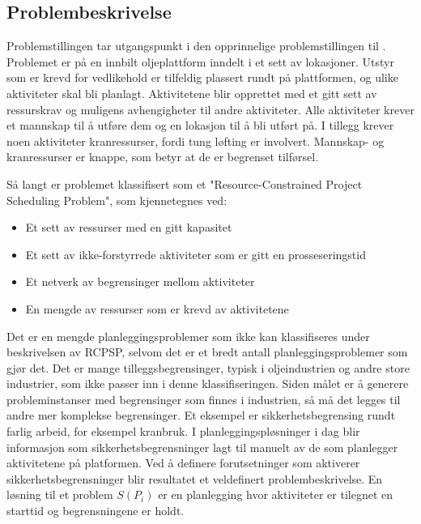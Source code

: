 \subsection{Problembeskrivelse}
Problemstillingen tar utgangspunkt i den opprinnelige problemstillingen til \bht. Problemet er på en innbilt oljeplattform inndelt i et sett av lokasjoner. Utstyr som er krevd for vedlikehold er tilfeldig plassert rundt på plattformen, og ulike aktiviteter skal bli planlagt. Aktivitetene blir opprettet med et gitt sett av ressurskrav og muligens avhengigheter til andre aktiviteter. Alle aktiviteter krever et mannskap til å utføre dem og en lokasjon til å bli utført på. I tillegg krever noen aktiviteter kranressurser, fordi tung løfting er involvert. Mannskap- og kranressurser er knappe, som betyr at de er begrenset tilførsel.

Så langt er problemet klassifisert som et "Resource-Constrained Project Scheduling Problem", som kjennetegnes ved:
\begin{itemize}
\item Et sett av ressurser med en gitt kapasitet
\item Et sett av ikke-forstyrrede aktiviteter som er gitt en prosseseringstid
\item Et netverk av begrensinger mellom aktiviteter
\item En mengde av ressurser som er krevd av aktivitetene
\end{itemize}

Det er en mengde planleggingsproblemer som ikke kan klassifiseres under beskrivelsen av RCPSP, selvom det er et bredt antall planleggingsproblemer som gjør det. Det er mange tilleggsbegrensinger, typisk i oljeindustrien og andre store industrier, som ikke passer inn i denne klassifiseringen. Siden målet er å generere probleminstanser med begrensinger som finnes i industrien, så må det legges til andre mer komplekse begrensinger. Et eksempel  er sikkerhetsbegrensing rundt farlig arbeid, for eksempel kranbruk. I planleggingspløsninger i dag blir informasjon som sikkerhetsbegrensninger lagt til manuelt av de som planlegger aktivitetene på platformen. Ved å definere forutsetninger som aktiverer sikkerhetsbegrensninger blir resultatet et veldefinert problembeskrivelse. En løsning til et problem $ S(P_{i}) $ er en planlegging hvor aktiviteter er tilegnet en starttid og begrensningene er holdt.

